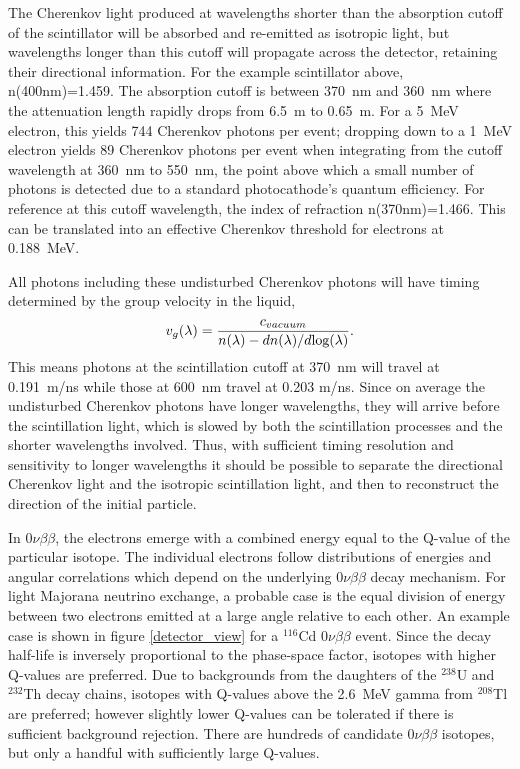 \documentclass[cits]{JINST}
\begin{document}
The Cherenkov light produced at wavelengths shorter than the
absorption cutoff of the scintillator will be absorbed and re-emitted
as isotropic light, but wavelengths longer than this cutoff will
propagate across the detector, retaining their directional
information. For the example scintillator above, n(400nm)=1.459\cite{OlegThesis}. The absorption cutoff is between 370~nm and 360~nm where the attenuation length rapidly drops from 6.5~m to 0.65~m. For a 5~MeV electron, this yields 744 Cherenkov photons per event; dropping down to a 1~MeV electron yields 89 Cherenkov photons per event when integrating from the cutoff wavelength at 360~nm to 550~nm, the point above which a small number of photons is detected due to a standard photocathode's quantum efficiency. For reference at this cutoff wavelength, the index of refraction n(370nm)=1.466. This can be translated into an effective Cherenkov threshold for electrons at 0.188~MeV.

All photons including these undisturbed Cherenkov
photons will have timing determined by the group 
velocity\cite{group_velocity_article,pdg_review_2012,tamm1939} in the liquid,
\begin{equation}
\label{eqGroup}
v_{g}(\lambda) = \frac{c_{vacuum}}{n(\lambda) - dn(\lambda)/d\textnormal{log}(\lambda)}.
\end{equation}
This means photons at the scintillation cutoff at 370~nm will travel at 0.191~m/ns while those at 600~nm travel at 0.203 m/ns. Since on average the undisturbed Cherenkov photons have longer wavelengths, they will arrive before the
scintillation light, which is slowed by both the scintillation
processes and the shorter wavelengths involved. Thus, with sufficient
timing resolution and sensitivity to longer wavelengths it should be
possible to separate the directional Cherenkov light and the isotropic
scintillation light, and then to reconstruct the direction of the
initial particle.

In $0\nu\beta\beta$, the electrons emerge with a combined energy equal
to the Q-value of the particular isotope. The individual
electrons follow distributions of energies and angular correlations which depend on the underlying $0\nu\beta\beta$ decay mechanism\cite{SuperNEMO,newphysics0nuBB,bandv}.
For light Majorana neutrino exchange, a probable case is the equal division of energy between two
electrons emitted at a large angle relative to each other\cite{phasespace, SuperNEMO}. An example case is shown in figure \ref{detector_view}
for a $^{116}$Cd $0\nu\beta\beta$ event. Since the decay
half-life is inversely proportional to the phase-space factor, isotopes with
higher Q-values are preferred. Due to backgrounds from the daughters
of the $^{238}$U and $^{232}$Th decay chains, isotopes with Q-values above the 2.6~MeV gamma from $^{208}$Tl are preferred; however slightly lower Q-values can be tolerated if there is sufficient background rejection. There are hundreds of candidate $0\nu\beta\beta$ isotopes\cite{tabledbb},
but only a handful with sufficiently large Q-values. 
\end{document}
